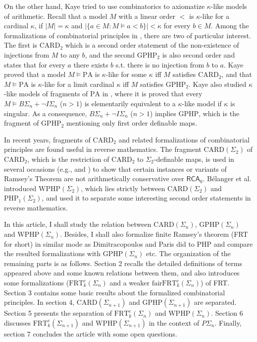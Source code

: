 \documentclass[twoside,a4paper]{amsart}
\theoremstyle{definition}
\theoremstyle{theorem}
\numberwithin{equation}{section}
\newcommand{\<}{\langle}
\renewcommand{\>}{\rangle}
\newcommand{\RCA}{\mathsf{RCA}}
\newcommand{\PA}{\mathrm{PA}}
\newcommand{\CARD}{\mathrm{CARD}}
\newcommand{\WPHP}{\mathrm{WPHP}}
\newcommand{\GPHP}{\mathrm{GPHP}}
\newcommand{\PHP}{\mathrm{PHP}}
\newcommand{\FRT}{\mathrm{FRT}}
\newcommand{\fairFRT}{\mathrm{fairFRT}}
\begin{document}
On the other hand, Kaye \cite{Kaye:1995.NDJFL} tried to use combinatorics to axiomatize $\kappa$-like models of arithmetic.
Recall that a model $M$ with a linear order $<$ is $\kappa$-like for a cardinal $\kappa$,
 if $|M| = \kappa$ and $|\{a \in M: M \models a < b\}| < \kappa$ for every $b \in M$.
Among the formalizations of combinatorial principles in \cite{Kaye:1995.NDJFL}, there are two of particular interest.
The first is $\CARD_2$ which is a second order statement of the non-existence of injections from $M$ to any $b$,
 and the second $\GPHP_2$ is also second order and states that for every $a$ there exists $b$
 s.t. there is no injection from $b$ to $a$.
Kaye proved that a model $M \models \PA$ is $\kappa$-like for some $\kappa$ iff $M$ satisfies $\CARD_2$,
 and that $M \models \PA$ is $\kappa$-like for a limit cardinal $\kappa$ iff $M$ satisfies $\GPHP_2$.
Kaye also studied $\kappa$-like models of fragments of $\PA$ in \cite{Kaye:1997.JLMC},
 where it is proved that every $M \models B\Sigma_n + \neg I\Sigma_n$ ($n > 1$) is elementarily equivalent to a $\kappa$-like model if $\kappa$ is singular.
As a consequence, $B\Sigma_n + \neg I\Sigma_n$ ($n > 1$) implies $\GPHP$,
 which is the fragment of $\GPHP_2$ mentioning only first order definable maps.

In recent years, fragments of $\CARD_2$ and related formalizations of combinatorial principles are found useful in reverse mathematics.
The fragment $\CARD(\Sigma_2)$ of $\CARD_2$, which is the restriction of $\CARD_2$ to $\Sigma_2$-definable maps, is used in several occasions (e.g., \cite{Seetapun.Slaman:1995} and \cite{Conidis.Slaman:2013.JSL}) to show that certain instances or variants of Ramsey's Theorem are not arithmetically conservative over $\RCA_0$.
B\'{e}langer et al. introduced $\WPHP(\Sigma_2)$, which lies strictly between $\CARD(\Sigma_2)$ and $\PHP_1(\Sigma_2)$, and used it to separate some interesting second order statements in reverse mathematics.

In this article, I shall study the relation between $\CARD(\Sigma_n)$, $\GPHP(\Sigma_n)$ and $\WPHP(\Sigma_n)$.
Besides, I shall also formalize finite Ramsey's theorem (FRT for short) in similar mode as Dimitracopoulos and Paris did to PHP and compare the resulted formalizations with $\GPHP(\Sigma_n)$ etc.
The organization of the remaining parts is as follows.
Section 2 recalls the detailed definitions of terms appeared above and some known relations between them, and also introduces some formalizations ($\FRT^e_k(\Sigma_n)$ and a weaker $\fairFRT^e_k(\Sigma_n)$) of FRT. 
Section 3 contains some basic results about the formalized combinatorial principles.
In section 4, $\CARD(\Sigma_{n+1})$ and $\GPHP(\Sigma_{n+1})$ are separated.
Section 5 presents the separation of $\FRT^e_k(\Sigma_n)$ and $\WPHP(\Sigma_n)$.
Section 6 discusses $\FRT^e_k(\Sigma_{n+1})$ and $\WPHP(\Sigma_{n+1})$ in the context of $P\Sigma_n$.
Finally, section 7 concludes the article with some open questions.
\end{document}
